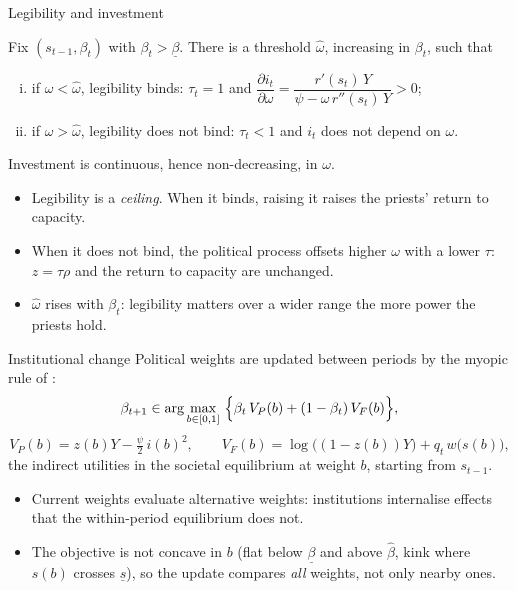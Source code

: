 \documentclass[11pt,aspectratio=169]{beamer}
\begin{document}
\begin{frame}{Legibility and investment}
\begin{lemma}
Fix $(s_{t-1},\beta_t)$ with $\beta_t>\underline\beta$. There is a threshold $\hat\omega$,
increasing in $\beta_t$, such that
\begin{enumerate}[(i)]
\item if $\omega<\hat\omega$, legibility binds: $\tau_t=1$ and
$\dfrac{\partial i_t}{\partial\omega}=\dfrac{r'(s_t)\,Y}{\psi-\omega\,r''(s_t)\,Y}>0$;
\item if $\omega>\hat\omega$, legibility does not bind: $\tau_t<1$ and $i_t$ does not depend on
$\omega$.
\end{enumerate}
Investment is continuous, hence non-decreasing, in $\omega$.
\end{lemma}
\begin{itemize}
\item Legibility is a \emph{ceiling}. When it binds, raising it raises the priests' return to
capacity.
\item When it does not bind, the political process offsets higher $\omega$ with a lower $\tau$:
$z=\tau\rho$ and the return to capacity are unchanged.
\item $\hat\omega$ rises with $\beta_t$: legibility matters over a wider range the more power the
priests hold.
\end{itemize}
\end{frame}

\begin{frame}{Institutional change}
Political weights are updated between periods by the myopic rule of \citet{bisin2024joint}:
\[
\beta_{t+1}\in\arg\max_{b\in[0,1]}\ \Bigl\{\beta_t\,V_P(b)+(1-\beta_t)\,V_F(b)\Bigr\},
\]
\[
V_P(b)=z(b)Y-\tfrac{\psi}{2}\,i(b)^2,\qquad
V_F(b)=\log\bigl((1-z(b))Y\bigr)+q_t\,w\bigl(s(b)\bigr),
\]
the indirect utilities in the societal equilibrium at weight $b$, starting from $s_{t-1}$.
\begin{itemize}
\item Current weights evaluate alternative weights: institutions internalise effects that the
within-period equilibrium does not.
\item The objective is not concave in $b$ (flat below $\underline\beta$ and above $\hat\beta$,
kink where $s(b)$ crosses $\underline s$), so the update compares \emph{all} weights, not only
nearby ones.
\end{itemize}
\end{frame}
\end{document}
